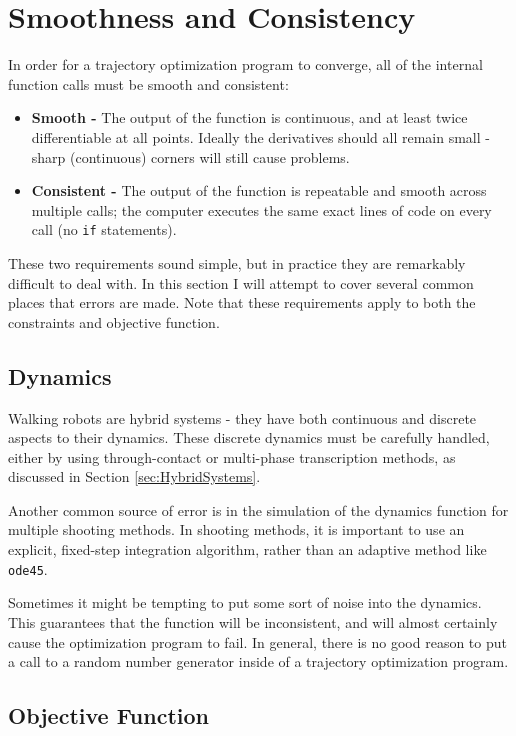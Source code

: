 \section{Smoothness and Consistency}

In order for a trajectory optimization program to converge, all of the internal function calls must be smooth and consistent:

\begin{itemize}
	\item {\bf Smooth - } The output of the function is continuous, and at least twice differentiable at all points. Ideally the derivatives should all remain small - sharp (continuous) corners will still cause problems.
	\item {\bf Consistent - } The output of the function is repeatable and smooth across multiple calls; the computer executes the same exact lines of code on every call (no \texttt{if} statements).
\end{itemize}

These two requirements sound simple, but in practice they are remarkably difficult to deal with. In this section I will attempt to cover several common places that errors are made. Note that these requirements apply to both the constraints and objective function.

\subsection{Dynamics}

Walking robots are hybrid systems - they have both continuous and discrete aspects to their dynamics. These discrete dynamics must be carefully handled, either by using through-contact or multi-phase transcription methods, as discussed in Section \ref{sec:HybridSystems}.

Another common source of error is in the simulation of the dynamics function for multiple shooting methods. In shooting methods, it is important to use an explicit, fixed-step integration algorithm, rather than an adaptive method like \texttt{ode45}.

\par Sometimes it might be tempting to put some sort of noise into the dynamics. This guarantees that the function will be inconsistent, and will almost certainly cause the optimization program to fail. In general, there is no good reason to put a call to a random number generator inside of a trajectory optimization program.

\subsection{Objective Function}

